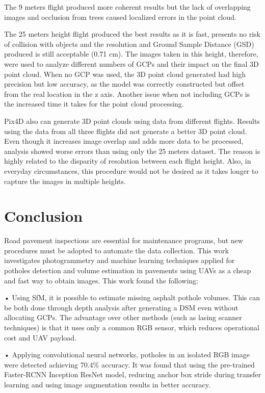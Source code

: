 \documentclass{article}
\begin{document}
The 9 meters flight produced more coherent results but the lack of overlapping images and occlusion from trees caused localized errors in the point cloud.

The 25 meters height flight produced the best results as it is fast, presents no risk of collision with objects and the resolution and Ground Sample Distance (GSD) produced is still acceptable (0.71 cm). The images taken in this height, therefore, were used to analyze different numbers of GCPs and their impact on the final 3D point cloud. When no GCP was used, the 3D point cloud generated had high precision but low accuracy, as the model was correctly constructed but offset from the real location in the z axis. Another issue when not including GCPs is the increased time it takes for the point cloud processing.

Pix4D also can generate 3D point clouds using data from different flights. Results using the data from all three flights did not generate a better 3D point cloud. Even though it increases image overlap and adds more data to be processed, analysis showed worse errors than using only the 25 meters dataset. The reason is highly related to the disparity of resolution between each flight height. Also, in everyday circumstances, this procedure would not be desired as it takes longer to capture the images in multiple heights.

\section{Conclusion}
\label{sec:conclusion}

Road pavement inspections are essential for maintenance programs, but new procedures must be adopted to automate the data collection. This work investigates photogrammetry and machine learning techniques applied for potholes detection and volume estimation in pavements using UAVs as a cheap and fast way to obtain images. This work found the following: 

•	Using SfM, it is possible to estimate missing asphalt pothole volumes. This can be both done through depth analysis after generating a DSM even without allocating GCPs. The advantage over other methods (such as lasing scanner techniques) is that it uses only a common RGB sensor, which reduces operational cost and UAV payload.

•	Applying convolutional neural networks, potholes in an isolated RGB image were detected achieving 70.4\% accuracy. It was found that using the pre-trained Faster-RCNN Inception ResNet model, reducing anchor box stride during transfer learning and using image augmentation results in better accuracy.
\end{document}
